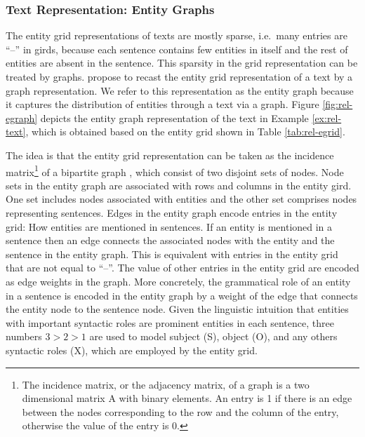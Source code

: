 \subsubsection{Text Representation: Entity Graphs}

The entity grid representations of texts are mostly sparse, i.e.\ many entries are ``--'' in girds,  because each sentence contains few entities in itself and the rest of entities are absent in the sentence. 
This sparsity in the grid representation can be treated by graphs. 
 propose to recast the entity grid representation of a text by a graph representation. 
We refer to this representation as the entity graph because it captures the distribution of entities through a text via a graph. 
Figure \ref{fig:rel-egraph} depicts the entity graph representation of the text in Example \ref{ex:rel-text}, which is obtained based on the entity grid shown in Table \ref{tab:rel-egrid}. 

The idea is that the entity grid representation \cite{barzilay08} can be taken as the incidence matrix\footnote{The incidence matrix, or the adjacency matrix, of a graph is a two dimensional matrix A with binary elements. An entry is 1 if there is an edge between the nodes corresponding to the row and the column of the entry, otherwise the value of the entry is 0.} of a bipartite graph \cite{guinaudeau13}, which consist of two disjoint sets of nodes.  
Node sets in the entity graph are associated with rows and columns in the entity gird. 
One set includes nodes associated with entities and the other set comprises nodes representing sentences.  
Edges in the entity graph encode entries in the entity grid: How entities are mentioned in sentences. 
If an entity is mentioned in a sentence then an edge connects the associated nodes with the entity and the sentence in the entity graph. 
This is equivalent with entries in the entity grid that are not equal to ``--''. 
The value of other entries in the entity grid are encoded as edge weights in the graph. 
More concretely, the grammatical role of an entity in a sentence is encoded in the entity graph by a weight of the edge that connects the entity node to the sentence node. 
Given the linguistic intuition that entities with important syntactic roles are prominent entities in each sentence, three numbers $3>2>1$ are used to model subject (S), object (O), and any others syntactic roles (X), which are employed by the entity grid. 

